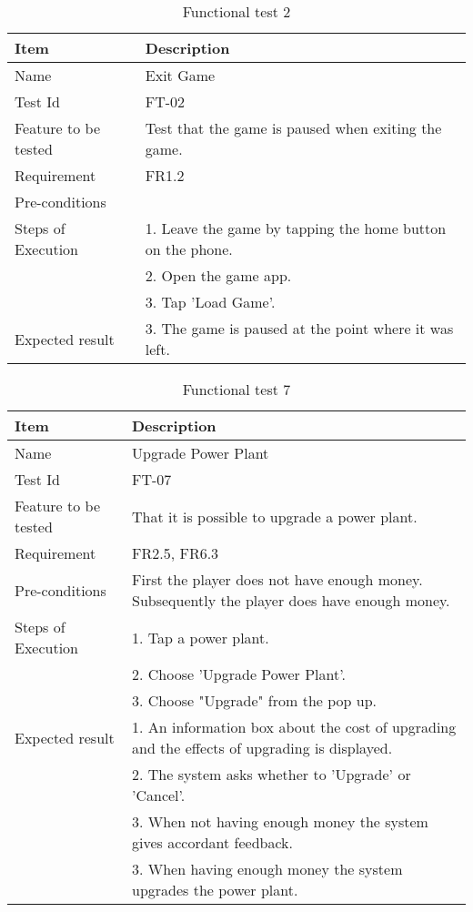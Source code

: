 \begin{table}[H]
\centering
	\begin{tabular}{ l | p{8cm} }
		\hline
		{\bf Item} & {\bf Description} \\ \hline
		Name & Exit Game \\ 
		Test Id & FT-02 \\ 
		Feature to be tested & Test that the game is paused when exiting the game. \\ 
		Requirement & FR1.2 \\ 
		Pre-conditions & \\ 
		Steps of Execution & 1. Leave the game by tapping the home button on the phone. \\
		& 2. Open the game app. \\
		& 3. Tap 'Load Game'. \\
		Expected result & 3. The game is paused at the point where it was left. \\  
	\end{tabular}
	\caption{Functional test 2}
\end{table}

\begin{table}[H]
\centering
	\begin{tabular}{ l | p{8cm} }
		\hline
		{\bf Item} & {\bf Description} \\ \hline
		Name & Upgrade Power Plant\\ 
		Test Id & FT-07 \\ 
		Feature to be tested & That it is possible to upgrade a power plant. \\ 
		Requirement & FR2.5, FR6.3 \\ 
		Pre-conditions & First the player does not have enough money. Subsequently the player does have enough money. \\ 
		Steps of Execution & 1. Tap a power plant. \\ 
		& 2. Choose 'Upgrade Power Plant'. \\
		& 3. Choose "Upgrade" from the pop up. \\
		Expected result & 1. An information box about the cost of upgrading and the effects of upgrading is displayed. \\
		& 2. The system asks whether to 'Upgrade' or 'Cancel'. \\
		& 3. When not having enough money the system gives accordant feedback. \\
		& 3. When having enough money the system upgrades the power plant. \\
	\end{tabular}
	\caption{Functional test 7}
\end{table}


